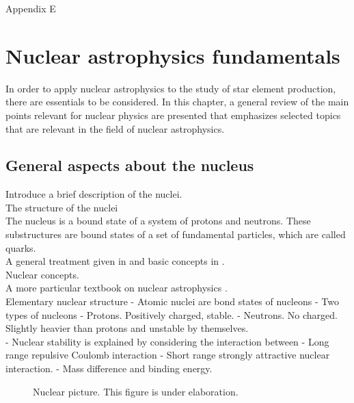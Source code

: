 \documentclass[openany]{book}
\begin{document}
Appendix E \\


\chapter{Nuclear astrophysics fundamentals}  \label{ch:nuclearAstrophysics}

In order to apply nuclear astrophysics to the study of star element production, there are essentials to be considered. In this chapter, a general review of the main points relevant for nuclear physics are presented that emphasizes selected topics that are relevant in the field of nuclear astrophysics.

\section{General aspects about the nucleus} \label{sec:nucleiAspects}
Introduce a brief description of the nuclei. \\
\indent The structure of the nuclei \\

The nucleus is a bound state of a system of protons and neutrons. These substructures are bound states of a set of fundamental particles, which are called quarks.  \\

A general treatment given in \cite{basdevant_rich_spiro_2004} and basic concepts in \cite{heyde_2020}. \\

\indent Nuclear concepts. \\

A more particular textbook on nuclear astrophysics \cite{iliadis_2015}. \\


Elementary nuclear structure 
-	Atomic nuclei are bond states of nucleons 
-	Two types of nucleons
	-	Protons. Positively charged, stable.
	-	Neutrons. No charged. Slightly heavier than protons and unstable by themselves. \\
	
-	Nuclear stability is explained by considering the interaction between 
	-	Long range repulsive Coulomb interaction 
	-   Short range strongly attractive nuclear interaction. 
	-	Mass difference and binding energy.
\\

\begin{figure}[H]
	
	\caption[Nuclear picture]{Nuclear picture. This figure is under elaboration.}
	\label{fig:nuclarPicture}
\end{figure}
\end{document}
